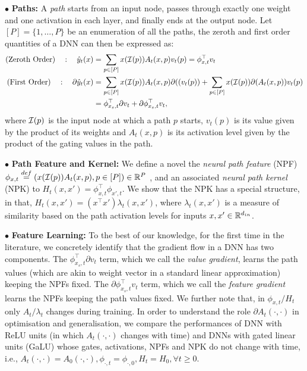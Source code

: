 \documentclass{article}
\begin{document}
$\bullet$ \textbf{Paths:}  A \emph{path} starts from an input node, passes through exactly one weight and one activation in each layer, and finally ends at the output node. Let $[P]=\{1,\ldots,P\}$ be an enumeration of all the paths, the zeroth and first order quantities of a DNN can then be expressed as:
\begin{align*}
\text{(Zeroth Order)}\quad: \quad \hat{y}_t(x)&=\sum_{p\in [P]}x(\mathcal{I}(p))A_t(x,p)v_t(p)={\phi^\top_{x,t}} v_t\\
\text{(First Order)}\quad: \quad \partial \hat{y}_t(x)&= \sum_{p\in [P]}x(\mathcal{I}(p)) A_t(x,p) \partial((v_t(p))+\sum_{p\in [P]}x(\mathcal{I}(p)) \partial(A_t(x,p)) v_t(p)\\
&=\phi^\top_{x_s,t} {\partial} v_t + {\partial} \phi^\top_{x_s,t} v_t,
\end{align*}
where $\mathcal{I}(p)$ is the input node at which a path $p$ starts, $v_t(p)$ is its value given by the product of its weights and $A_t(x,p)$ is its activation level given by the product of the gating values in the path. 

$\bullet$ \textbf{Path Feature and Kernel:}  We define a novel the \emph{neural path feature} (NPF) $\phi_{x,t}\stackrel{def}=\left( x(\mathcal{I}(p))A_t(x,p),p\in[P]\right)\in \mathbb{R}^P$ , and an associated \emph{neural path kernel} (NPK) to $H_t(x,x')=\phi^\top_{x,t}\phi_{x',t}$. We show that the NPK has a special structure, in that, $H_t(x,x')=(x^\top x')\lambda_t(x,x')$, where $\lambda_t(x,x')$ is a measure of similarity based on the path activation levels for inputs $x,x'\in\mathbb{R}^{d_{in}}$. %

$\bullet$ \textbf{Feature Learning:} To the best of our knowledge, for the first time in the literature, we concretely identify that the gradient flow in a DNN has two components. The $\phi^\top_{x_s,t} {\partial} v_t $ term, which we call the \emph{value gradient}, learns the path values (which are akin to weight vector in a standard linear approximation) keeping the NPFs fixed. The $ {\partial} \phi^\top_{x_s,t} v_t$ term, which we call the \emph{feature gradient} learns the NPFs keeping the path values fixed. We further note that, in $\phi_{x,t}/H_t$ only $A_t/\lambda_t$ changes during training. In order to understand the role $\partial A_t(\cdot,\cdot)$ in optimisation and generalisation, we compare the performances of DNN with ReLU units (in which $A_t(\cdot,\cdot)$ changes with time) and DNNs with gated linear units (GaLU) whose gates, activations, NPFs and NPK do not change with time, i.e., $A_t(\cdot,\cdot)=A_0(\cdot,\cdot), \phi_{\cdot,t}=\phi_{\cdot,0}, H_t=H_0,\forall t\geq 0$. 
\end{document}
